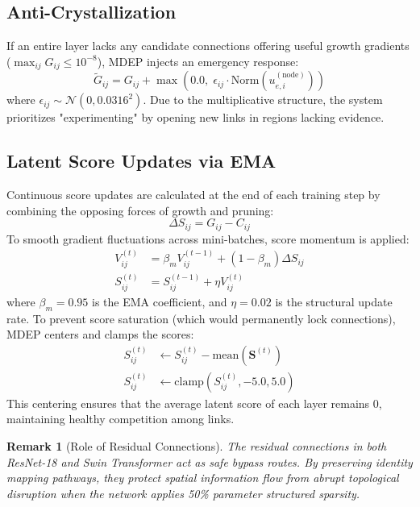 \documentclass[letterpaper]{article} %
\newtheorem{remark}{Remark}
\begin{document}
\subsection{Anti-Crystallization}\label{subsec:anti_crystal}

If an entire layer lacks any candidate connections offering useful growth gradients ($\max_{ij} G_{ij} \le 10^{-8}$), MDEP injects an emergency response:
\begin{equation}\label{eq:anti_crystal_eq}
    \tilde{G}_{ij} = G_{ij} + \max\!\left(0.0,\; \epsilon_{ij} \cdot \text{Norm}(u_{e,i}^{(\text{node})})\right)
\end{equation}
where $\epsilon_{ij} \sim \mathcal{N}(0, 0.0316^2)$. Due to the multiplicative structure, the system prioritizes "experimenting" by opening new links in regions lacking evidence.

\subsection{Latent Score Updates via EMA}\label{subsec:score_update}

Continuous score updates are calculated at the end of each training step by combining the opposing forces of growth and pruning:
\begin{equation}\label{eq:delta_S}
    \Delta S_{ij} = G_{ij} - C_{ij}
\end{equation}
To smooth gradient fluctuations across mini-batches, score momentum is applied:
\begin{align}
    V_{ij}^{(t)} &= \beta_m V_{ij}^{(t-1)} + (1 - \beta_m) \Delta S_{ij} \\
    S_{ij}^{(t)} &= S_{ij}^{(t-1)} + \eta V_{ij}^{(t)}
\end{align}
where $\beta_m = 0.95$ is the EMA coefficient, and $\eta = 0.02$ is the structural update rate. To prevent score saturation (which would permanently lock connections), MDEP centers and clamps the scores:
\begin{align}
    S_{ij}^{(t)} &\leftarrow S_{ij}^{(t)} - \text{mean}(\bm{S}^{(t)}) \\
    S_{ij}^{(t)} &\leftarrow \text{clamp}(S_{ij}^{(t)}, -5.0, 5.0)
\end{align}
This centering ensures that the average latent score of each layer remains 0, maintaining healthy competition among links.

\begin{remark}[Role of Residual Connections]
The residual connections in both ResNet-18 and Swin Transformer act as safe bypass routes. By preserving identity mapping pathways, they protect spatial information flow from abrupt topological disruption when the network applies 50\% parameter structured sparsity.
\end{remark}
\end{document}
